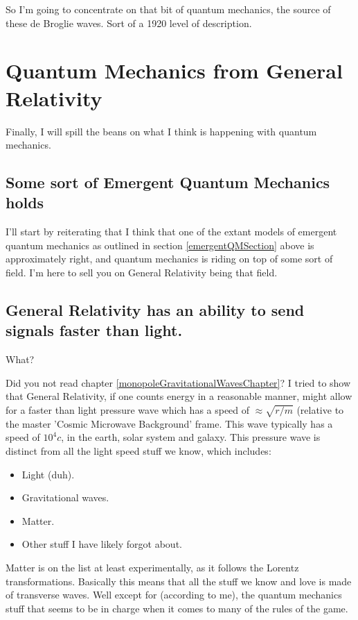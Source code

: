 \documentclass[../rzero]{subfiles}
\begin{document}
So I'm going to concentrate on that bit of quantum mechanics, the source of these de Broglie waves. Sort of a 1920 level of description.

\section{Quantum Mechanics from General Relativity}
Finally, I will spill the beans on what I think is happening with quantum mechanics. 

\subsection{Some sort of Emergent Quantum Mechanics holds}
I'll start by reiterating that I think that one of the extant models of emergent quantum mechanics as outlined in section \ref{emergentQMSection} above is approximately right, and quantum mechanics is riding on top of some sort of field. I'm here to sell you on General Relativity being that field. 

\subsection{General Relativity has an ability to send signals faster than light.}
What? 

Did you not read chapter \ref{monopoleGravitationalWavesChapter}? I tried to show that General Relativity, if one counts energy in a reasonable manner, might allow for a faster than light pressure wave which has a speed of $\approx \sqrt{r/m}$ (relative to the master 'Cosmic Microwave Background' frame. This wave typically has a speed of $10^4 c$, in the earth, solar system and galaxy. This pressure wave is distinct from all the light speed stuff we know, which includes:

\begin{itemize}
  \item Light (duh).
  \item Gravitational waves.
  \item Matter.
  \item Other stuff I have likely forgot about.
\end{itemize}

Matter is on the list at least experimentally, as it follows the Lorentz transformations. Basically this means that all the stuff we know and love is made of transverse waves. Well except for (according to me), the quantum mechanics stuff that seems to be in charge when it comes to many of the rules of the game. 
\end{document}
